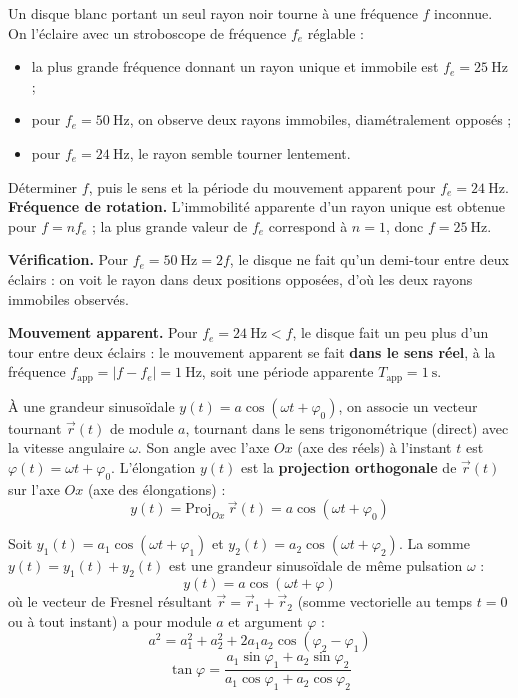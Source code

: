 \documentclass[11pt]{article}
\newcounter{popsec}
\newcounter{popsub}
\newcommand{\courssub}[1]{%
  \stepcounter{popsub}%
  \par\vspace{9pt}\noindent{\popxbold\fontsize{11.5}{13}\selectfont\color{popink}{\color{poporange}\thepopsec.\thepopsub}\hspace{6pt}#1}\par\nopagebreak\vspace{4pt}
}
\begin{document}
\begin{exoresolu}
Un disque blanc portant un seul rayon noir tourne à une fréquence $f$ inconnue. On l'éclaire avec un stroboscope de fréquence $f_e$ réglable :
\begin{itemize}
\item la plus grande fréquence donnant un rayon unique et immobile est $f_e = \SI{25}{\hertz}$ ;
\item pour $f_e = \SI{50}{\hertz}$, on observe deux rayons immobiles, diamétralement opposés ;
\item pour $f_e = \SI{24}{\hertz}$, le rayon semble tourner lentement.
\end{itemize}
Déterminer $f$, puis le sens et la période du mouvement apparent pour $f_e = \SI{24}{\hertz}$.
\tcblower
\textbf{Fréquence de rotation.} L'immobilité apparente d'un rayon unique est obtenue pour $f = n f_e$ ; la plus grande valeur de $f_e$ correspond à $n = 1$, donc $f = \SI{25}{\hertz}$.

\textbf{Vérification.} Pour $f_e = \SI{50}{\hertz} = 2f$, le disque ne fait qu'un demi-tour entre deux éclairs : on voit le rayon dans deux positions opposées, d'où les deux rayons immobiles observés.

\textbf{Mouvement apparent.} Pour $f_e = \SI{24}{\hertz} < f$, le disque fait un peu plus d'un tour entre deux éclairs : le mouvement apparent se fait \textbf{dans le sens réel}, à la fréquence $f_{\text{app}} = |f - f_e| = \SI{1}{\hertz}$, soit une période apparente $T_{\text{app}} = \SI{1}{\second}$.
\end{exoresolu}

\courssub{Représentation de Fresnel}

\begin{definition}
À une grandeur sinusoïdale $y(t) = a \cos(\omega t + \varphi_0)$, on associe un vecteur tournant $\vec{r}(t)$ de module $a$, tournant dans le sens trigonométrique (direct) avec la vitesse angulaire $\omega$. Son angle avec l'axe $Ox$ (axe des réels) à l'instant $t$ est $\varphi(t) = \omega t + \varphi_0$.
L'élongation $y(t)$ est la \textbf{projection orthogonale} de $\vec{r}(t)$ sur l'axe $Ox$ (axe des élongations) :
\[ y(t) = \text{Proj}_{Ox}\, \vec{r}(t) = a \cos(\omega t + \varphi_0) \]
\end{definition}

\begin{propriete}
Soit $y_1(t) = a_1 \cos(\omega t + \varphi_1)$ et $y_2(t) = a_2 \cos(\omega t + \varphi_2)$.
La somme $y(t) = y_1(t) + y_2(t)$ est une grandeur sinusoïdale de même pulsation $\omega$ :
\[ y(t) = a \cos(\omega t + \varphi) \]
où le vecteur de Fresnel résultant $\vec{r} = \vec{r}_1 + \vec{r}_2$ (somme vectorielle au temps $t=0$ ou à tout instant) a pour module $a$ et argument $\varphi$ :
\[ a^2 = a_1^2 + a_2^2 + 2 a_1 a_2 \cos(\varphi_2 - \varphi_1) \]
\[ \tan\varphi = \frac{a_1 \sin\varphi_1 + a_2 \sin\varphi_2}{a_1 \cos\varphi_1 + a_2 \cos\varphi_2} \]
\end{propriete}
\end{document}
